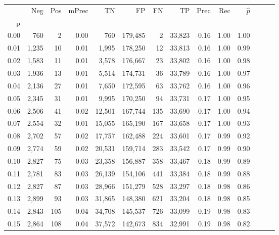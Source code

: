 \begin{tabular}{rrrrrrrrrrrrrr}
\toprule
{} &    Neg &  Pos & mPrec &       TN &       FP &      FN &      TP &  Prec &   Rec & $\hat{p}$ \\
p    &        &      &       &          &          &         &         &       &       &           \\
\midrule
0.00 &    760 &    2 &  0.00 &      760 &  179,485 &       2 &  33,823 &  0.16 &  1.00 &      1.00 \\
0.01 &  1,235 &   10 &  0.01 &    1,995 &  178,250 &      12 &  33,813 &  0.16 &  1.00 &      0.99 \\
0.02 &  1,583 &   11 &  0.01 &    3,578 &  176,667 &      23 &  33,802 &  0.16 &  1.00 &      0.98 \\
0.03 &  1,936 &   13 &  0.01 &    5,514 &  174,731 &      36 &  33,789 &  0.16 &  1.00 &      0.97 \\
0.04 &  2,136 &   27 &  0.01 &    7,650 &  172,595 &      63 &  33,762 &  0.16 &  1.00 &      0.96 \\
0.05 &  2,345 &   31 &  0.01 &    9,995 &  170,250 &      94 &  33,731 &  0.17 &  1.00 &      0.95 \\
0.06 &  2,506 &   41 &  0.02 &   12,501 &  167,744 &     135 &  33,690 &  0.17 &  1.00 &      0.94 \\
0.07 &  2,554 &   32 &  0.01 &   15,055 &  165,190 &     167 &  33,658 &  0.17 &  1.00 &      0.93 \\
0.08 &  2,702 &   57 &  0.02 &   17,757 &  162,488 &     224 &  33,601 &  0.17 &  0.99 &      0.92 \\
0.09 &  2,774 &   59 &  0.02 &   20,531 &  159,714 &     283 &  33,542 &  0.17 &  0.99 &      0.90 \\
0.10 &  2,827 &   75 &  0.03 &   23,358 &  156,887 &     358 &  33,467 &  0.18 &  0.99 &      0.89 \\
0.11 &  2,781 &   83 &  0.03 &   26,139 &  154,106 &     441 &  33,384 &  0.18 &  0.99 &      0.88 \\
0.12 &  2,827 &   87 &  0.03 &   28,966 &  151,279 &     528 &  33,297 &  0.18 &  0.98 &      0.86 \\
0.13 &  2,899 &   93 &  0.03 &   31,865 &  148,380 &     621 &  33,204 &  0.18 &  0.98 &      0.85 \\
0.14 &  2,843 &  105 &  0.04 &   34,708 &  145,537 &     726 &  33,099 &  0.19 &  0.98 &      0.83 \\
0.15 &  2,864 &  108 &  0.04 &   37,572 &  142,673 &     834 &  32,991 &  0.19 &  0.98 &      0.82 \\

\end{tabular}
